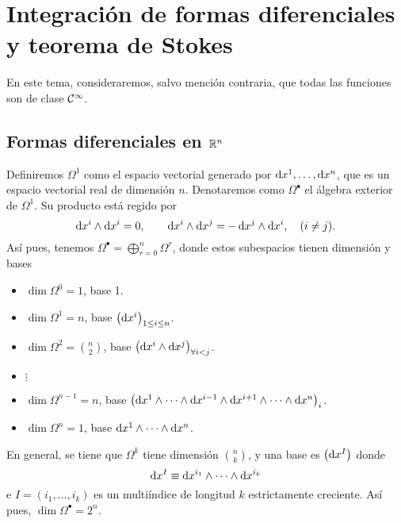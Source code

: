 \chapter{Integración de formas diferenciales y teorema de Stokes}

En este tema, consideraremos, salvo mención contraria, que todas las funciones son de clase $\mathcal{C}^\infty$.

\section{Formas diferenciales en $\mathbb{R}^n$}

\begin{defi}
    Definiremos $\Omega^1$ como el espacio vectorial generado por $\dif x^1, \dots, \dif x^n$, que es un espacio vectorial real de dimensión $n$.
    Denotaremos como $\Omega^\bullet$ el álgebra exterior de $\Omega^1$. Su producto está regido por
    \[
        \dif x^i \wedge \dif x^i = 0,
        \qquad
        \dif x^i \wedge \dif x^j = -\dif x^j \wedge \dif x^i, \quad (i \neq j).
    \]
    Así pues, tenemos $\Omega^\bullet = \bigoplus\limits^{n}_{r = 0} \Omega^r$, donde estos subespacios tienen dimensión y bases
    \begin{itemize}
        \item $\dim \Omega^0 = 1$, base 1.
        \item $\dim \Omega^1 = n$, base $\left( \dif x^i \right)_{1 \leq i \leq n}$.
        \item $\dim \Omega^2 = \binom{n}{2}$, base $\left( \dif x^i \wedge \dif x^j \right)_{\forall i < j}$.
        \item $\vdots$
        \item $\dim \Omega^{n-1} = n$, base $\left( \dif x^1 \wedge \cdots \wedge \dif x^{i-1} \wedge \dif x^{i+1} \wedge \cdots \wedge \dif x^n \right)_i$.
        \item $\dim \Omega^n = 1$, base $\dif x^1 \wedge \cdots \wedge \dif x^n$.
    \end{itemize}

    En general, se tiene que $\Omega^k$ tiene dimensión $\binom{n}{k}$, y una base es $\left( \dif x^I \right)$ donde
    \[
        \dif x^I \equiv \dif x^{i_1} \wedge \cdots \wedge \dif x^{i_k}
    \]
    e $I = \left( i_1, \dots, i_k \right)$ es un multiíndice de longitud $k$ estrictamente creciente. Así pues, $\dim\Omega^\bullet = 2^n$.
\end{defi}

